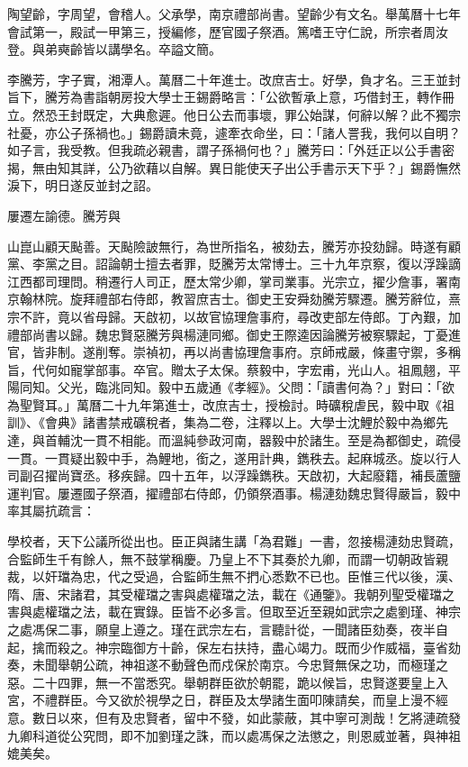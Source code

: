 \begin{pinyinscope}
{陶望齡，字周望，會稽人。父承學，南京禮部尚書。望齡少有文名。舉萬曆十七年會試第一，殿試一甲第三，授編修，歷官國子祭酒。篤嗜王守仁說，所宗者周汝登。與弟奭齡皆以講學名。卒謚文簡。

李騰芳，字子實，湘潭人。萬曆二十年進士。改庶吉士。好學，負才名。三王並封旨下，騰芳為書詣朝房投大學士王錫爵略言：「公欲暫承上意，巧借封王，轉作冊立。然恐王封既定，大典愈遲。他日公去而事壞，罪公始謀，何辭以解？此不獨宗社憂，亦公子孫禍也。」錫爵讀未竟，遽牽衣命坐，曰：「諸人詈我，我何以自明？如子言，我受教。但我疏必親書，謂子孫禍何也？」騰芳曰：「外廷正以公手書密揭，無由知其詳，公乃欲藉以自解。異日能使天子出公手書示天下乎？」錫爵憮然淚下，明日遂反並封之詔。

屢遷左諭德。騰芳與{山崑山顧天颭善。天颭險詖無行，為世所指名，被劾去，騰芳亦投劾歸。時遂有顧黨、李黨之目。詔論朝士擅去者罪，貶騰芳太常博士。三十九年京察，復以浮躁謫江西都司理問。稍遷行人司正，歷太常少卿，掌司業事。光宗立，擢少詹事，署南京翰林院。旋拜禮部右侍郎，教習庶吉士。御史王安舜劾騰芳驟遷。騰芳辭位，熹宗不許，竟以省母歸。天啟初，以故官協理詹事府，尋改吏部左侍郎。丁內艱，加禮部尚書以歸。魏忠賢惡騰芳與楊漣同鄉。御史王際逵因論騰芳被察驟起，丁憂進官，皆非制。遂削奪。崇禎初，再以尚書協理詹事府。京師戒嚴，條畫守禦，多稱旨，代何如寵掌部事。卒官。贈太子太保。蔡毅中，字宏甫，光山人。祖鳳翹，平陽同知。父光，臨洮同知。毅中五歲通《孝經》。父問：「讀書何為？」對曰：「欲為聖賢耳。」萬曆二十九年第進士，改庶吉士，授檢討。時礦稅虐民，毅中取《祖訓》、《會典》諸書禁戒礦稅者，集為二卷，注釋以上。大學士沈鯉於毅中為鄉先達，與首輔沈一貫不相能。而溫純參政河南，器毅中於諸生。至是為都御史，疏侵一貫。一貫疑出毅中手，為鯉地，銜之，遂用計典，鐫秩去。起麻城丞。旋以行人司副召擢尚寶丞。移疾歸。四十五年，以浮躁鐫秩。天啟初，大起廢籍，補長蘆鹽運判官。屢遷國子祭酒，擢禮部右侍郎，仍領祭酒事。楊漣劾魏忠賢得嚴旨，毅中率其屬抗疏言：

學校者，天下公議所從出也。臣正與諸生講「為君難」一書，忽接楊漣劾忠賢疏，合監師生千有餘人，無不鼓掌稱慶。乃皇上不下其奏於九卿，而謂一切朝政皆親裁，以奸璫為忠，代之受過，合監師生無不捫心悉歎不已也。臣惟三代以後，漢、隋、唐、宋諸君，其受權璫之害與處權璫之法，載在《通鑒》。我朝列聖受權璫之害與處權璫之法，載在實錄。臣皆不必多言。但取至近至親如武宗之處劉瑾、神宗之處馮保二事，願皇上遵之。瑾在武宗左右，言聽計從，一聞諸臣劾奏，夜半自起，擒而殺之。神宗臨御方十齡，保左右扶持，盡心竭力。既而少作威福，臺省劾奏，未聞舉朝公疏，神祖遂不動聲色而戍保於南京。今忠賢無保之功，而極瑾之惡。二十四罪，無一不當悉究。舉朝群臣欲於朝罷，跪以候旨，忠賢遂要皇上入宮，不禮群臣。今又欲於視學之日，群臣及太學諸生面叩陳請矣，而皇上漫不經意。數日以來，但有及忠賢者，留中不發，如此蒙蔽，其中寧可測哉！乞將漣疏發九卿科道從公究問，即不加劉瑾之誅，而以處馮保之法懲之，則恩威並著，與神祖媲美矣。

}}
\end{pinyinscope}
